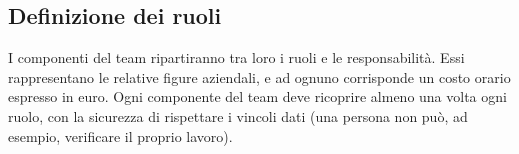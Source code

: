 \subsection*{Definizione dei ruoli}
I componenti del team ripartiranno tra loro i ruoli e le responsabilit\`a. Essi rappresentano le relative figure aziendali, e ad ognuno corrisponde un costo orario espresso in euro.
Ogni componente del team deve ricoprire almeno una volta ogni ruolo, con la sicurezza di rispettare i vincoli dati (una persona non pu\`o, ad esempio, verificare il proprio lavoro).
